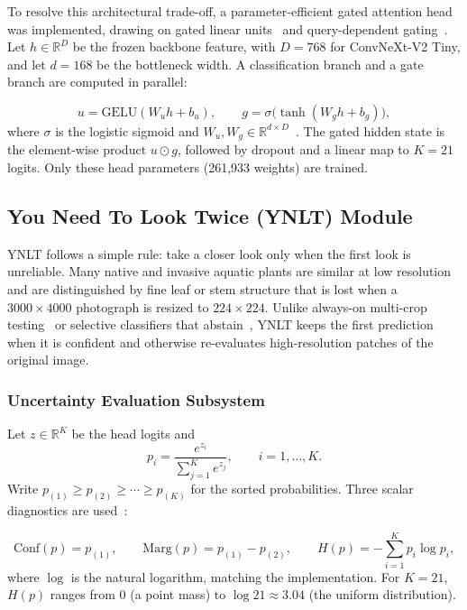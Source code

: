 \documentclass[final,3p,times,twocolumn]{elsarticle}
\begin{document}
To resolve this architectural trade-off, a parameter-efficient gated attention head was implemented, drawing on gated linear units~\citep{Dauphinetal2017} and query-dependent gating~\citep{Qiuetal2025}. Let \(h \in \mathbb{R}^{D}\) be the frozen backbone feature, with \(D=768\) for ConvNeXt-V2 Tiny, and let \(d=168\) be the bottleneck width. A classification branch and a gate branch are computed in parallel:

\[
u = \mathrm{GELU}(W_u h + b_u), \qquad
g = \sigma\bigl(\tanh(W_g h + b_g)\bigr),
\]
where \(\sigma\) is the logistic sigmoid and \(W_u, W_g \in \mathbb{R}^{d \times D}\)~\citep{HendrycksandGimpel2016}. The gated hidden state is the element-wise product \(u \odot g\), followed by dropout and a linear map to \(K=21\) logits. Only these head parameters (261{,}933 weights) are trained.

\subsection{You Need To Look Twice (YNLT) Module}

YNLT follows a simple rule: take a closer look only when the first look is unreliable. Many native and invasive aquatic plants are similar at low resolution and are distinguished by fine leaf or stem structure that is lost when a $3000\times 4000$ photograph is resized to $224\times 224$. Unlike always-on multi-crop testing~\citep{krizhevsky2012imagenet} or selective classifiers that abstain~\citep{geifman2017selective}, YNLT keeps the first prediction when it is confident and otherwise re-evaluates high-resolution patches of the original image.

\subsubsection{Uncertainty Evaluation Subsystem}

Let \(z \in \mathbb{R}^{K}\) be the head logits and
\[
p_i = \frac{e^{z_i}}{\sum_{j=1}^{K} e^{z_j}}, \qquad i=1,\ldots,K.
\]
Write \(p_{(1)}\ge p_{(2)}\ge \cdots \ge p_{(K)}\) for the sorted probabilities. Three scalar diagnostics are used~\citep{Guoetal2017, Ovadiaetal2019, hendrycks2017baseline}:

\[
\mathrm{Conf}(p) = p_{(1)}, \qquad
\mathrm{Marg}(p) = p_{(1)}-p_{(2)}, \qquad
H(p) = -\sum_{i=1}^{K} p_i \log p_i,
\]
where \(\log\) is the natural logarithm, matching the implementation. For \(K=21\), \(H(p)\) ranges from \(0\) (a point mass) to \(\log 21 \approx 3.04\) (the uniform distribution).
\end{document}
